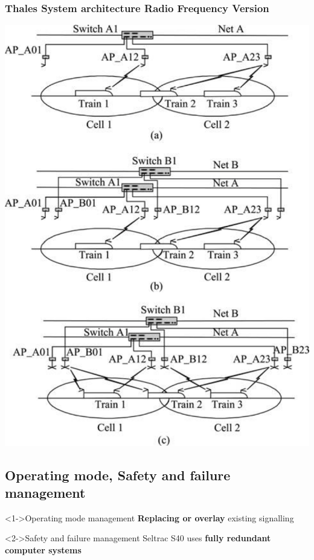 \frame
{
  \frametitle{Thales System architecture Radio Frequency Version}
 \begin{center}
	\includegraphics[scale=0.45]{./fig/SeltracRFArchitetture}
      \end{center}
      
   
}

\subsection{Operating mode, Safety and failure management}
\frame
{
\begin{block}<1->{Operating mode management}
\textbf{Replacing or overlay} existing signalling
\end{block}
\begin{alertblock}<2->{Safety and failure management}
Seltrac S40 uses \textbf{fully redundant computer systems }

   \end{alertblock}
}


